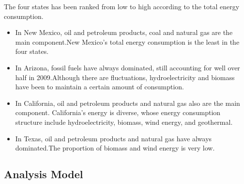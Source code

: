\documentclass{mcmthesis}
\begin{document}
The four states has been ranked from low to high according to the total energy consumption.
\begin{itemize}
	\item In New Mexico, oil and petroleum products, coal and natural gas are the main component.New Mexico's total energy consumption is the least in the four states.
	\item In Arizona, fossil fuels have always dominated, still accounting for well over half in 2009.Although there are fluctuations, hydroelectricity and biomass have been to maintain a certain amount of consumption.
	\item In California, oil and petroleum products and natural gas also are the main component. California's energy is diverse, whose energy consumption structure include hydroelectricity, biomass, wind energy, and geothermal.
	\item In Texas, oil and petroleum products and natural gas have always dominated.The proportion of biomass and wind energy is very low.
\end{itemize}
\subsection{Analysis Model}
\end{document}
